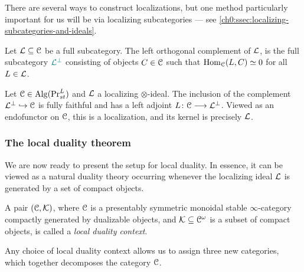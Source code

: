There are several ways to construct localizations, but one method particularly important for us will be via localizing subcategories --- see \cref{ch0:ssec:localizing-subcategories-and-ideals}. 

\begin{definition}
    \label{ch0:def:left-orthogonal-complement}
    Let $\mathcal{L}\subseteq \EuScript{C}$ be a full subcategory. The { left orthogonal complement} of $\mathcal{L}$, is the full subcategory ${\color{teal} \mathcal{L}^\perp}$ consisting of objects $C\in \EuScript{C}$ such that $\operatorname{Hom}_{\EuScript{C}}(L,C)\simeq 0$ for all $L\in \mathcal{L}$.  
\end{definition}

\begin{example}
    \label{ch0:ex:localization-from-localizing-subcategory}
    Let $\EuScript{C}\in \operatorname{Alg}(\mathrm{Pr}_{st}^L)$ and $\mathcal{L}$ a localizing $\otimes$-ideal. The inclusion of the complement $\mathcal{L}^\perp \hookrightarrow \EuScript{C}$ is fully faithful and has a left adjoint $L\colon \EuScript{C}\longrightarrow \mathcal{L}^\perp$. Viewed as an endofunctor on $\EuScript{C}$, this is a localization, and its kernel is precisely $\mathcal{L}$. 
\end{example}



\subsubsection{The local duality theorem}

We are now ready to present the setup for local duality. In essence, it can be viewed as a natural duality theory occurring whenever the localizing ideal $\mathcal{L}$ is generated by a set of compact objects. 

\begin{definition}
    \label{ch0:def:local-duality-context}
    A pair $(\EuScript{C}, \mathcal{K})$, where $\EuScript{C}$ is a presentably symmetric monoidal stable $\infty$-category compactly generated by dualizable objects, and $\mathcal{K}\subseteq \EuScript{C}^\omega$ is a subset of compact objects, is called a \emph{local duality context}.
\end{definition}

Any choice of local duality context allows us to assign three new categories, which together decomposes the category $\EuScript{C}$. 

